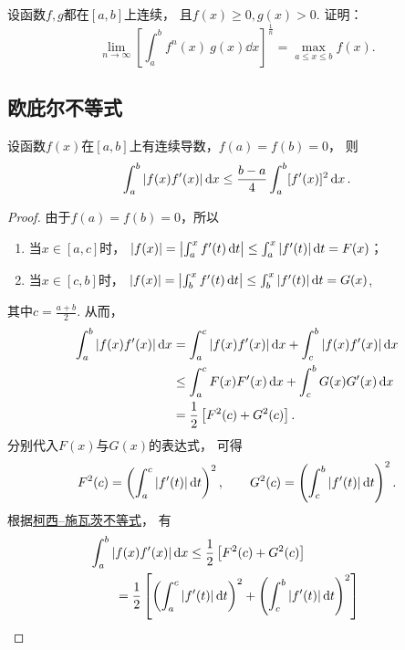 \begin{example}
设函数\(f,g\)都在\([a,b]\)上连续，
且\(f(x)\geq0,
g(x)>0\).
证明：\[
	\lim_{n\to\infty} \left[ \int_a^b f^n(x)~g(x) \dd{x} \right]^{\frac1n}
	= \max_{a \leq x \leq b} f(x).
\]
\end{example}

\subsection{欧庇尔不等式}
\begin{theorem}[欧庇尔不等式]\label{theorem:定积分.欧庇尔不等式}
设函数\(f(x)\)在\([a,b]\)上有连续导数，\(f(a)=f(b)=0\)，
则\begin{equation}\label{equation:定积分.欧庇尔不等式}
	\int_a^b \abs{f(x) f'(x)} \dd{x}
	\leq \frac{b-a}{4}
	\int_a^b [f'(x)]^2 \dd{x}.
\end{equation}
\begin{proof}
由于\(f(a)=f(b)=0\)，所以\begin{enumerate}
	\item 当\(x \in \left[a,c\right]\)时，
	\(\abs{f(x)} = \abs{\int_a^x f'(t) \dd{t}} \leq \int_a^x \abs{f'(t)} \dd{t} = F(x)\)；
	\item 当\(x \in \left[c,b\right]\)时，
	\(\abs{f(x)} = \abs{\int_b^x f'(t) \dd{t}} \leq \int_b^x \abs{f'(t)} \dd{t} = G(x)\),
\end{enumerate}
其中\(c=\frac{a+b}{2}\).
从而，\begin{align*}
	\int_a^b \abs{f(x) f'(x)} \dd{x}
	&= \int_a^c \abs{f(x) f'(x)} \dd{x}
		+ \int_c^b \abs{f(x) f'(x)} \dd{x} \\
	&\leq \int_a^c F(x) F'(x) \dd{x}
		+ \int_c^b G(x) G'(x) \dd{x} \\
	&= \frac{1}{2} \left[ F^2(c) + G^2(c) \right].
\end{align*}
分别代入\(F(x)\)与\(G(x)\)的表达式，
可得\[
	F^2(c) = \left( \int_a^c \abs{f'(t)} \dd{t} \right)^2,
	\qquad
	G^2(c) = \left( \int_c^b \abs{f'(t)} \dd{t} \right)^2.
\]
根据\hyperref[equation:定积分.柯西--施瓦茨不等式]{柯西--施瓦茨不等式}，
有\begin{align*}
	&\hspace{-20pt}\int_a^b{\abs{f(x) f'(x)} \dd{x}}
	\leq \frac{1}{2} \left[
		F^2(c)
		+ G^2(c)
		\right] \\
	&= \frac{1}{2} \left[
		\left(\int_a^c{\abs{f'(t)}\dd{t}}\right)^2
		+\left(\int_c^b{\abs{f'(t)}\dd{t}}\right)^2
		\right] \\

\end{align*}
\end{proof}
\end{theorem}
